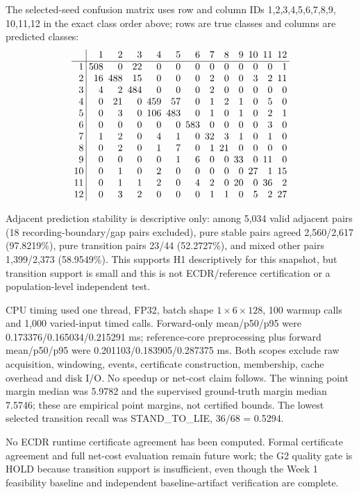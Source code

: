 \documentclass[11pt,a4paper]{article}
\begin{document}
The selected-seed confusion matrix uses row and column IDs 1,2,3,4,5,6,7,8,9,
10,11,12 in the exact class order above; rows are true classes and columns are
predicted classes:
\[
\setlength{\arraycolsep}{2.5pt}
\begin{array}{r|rrrrrrrrrrrr}
&1&2&3&4&5&6&7&8&9&10&11&12\\\hline
1&508&0&22&0&0&0&0&0&0&0&0&1\\
2&16&488&15&0&0&0&2&0&0&3&2&11\\
3&4&2&484&0&0&0&2&0&0&0&0&0\\
4&0&21&0&459&57&0&1&2&1&0&5&0\\
5&0&3&0&106&483&0&1&0&1&0&2&1\\
6&0&0&0&0&0&583&0&0&0&0&3&0\\
7&1&2&0&4&1&0&32&3&1&0&1&0\\
8&0&2&0&1&7&0&1&21&0&0&0&0\\
9&0&0&0&0&1&6&0&0&33&0&11&0\\
10&0&1&0&2&0&0&0&0&0&27&1&15\\
11&0&1&1&2&0&4&2&0&20&0&36&2\\
12&0&3&2&0&0&0&1&1&0&5&2&27
\end{array}
\]

Adjacent prediction stability is descriptive only: among 5,034 valid adjacent
pairs (18 recording-boundary/gap pairs excluded), pure stable pairs agreed
2,560/2,617 (97.8219\%), pure transition pairs 23/44 (52.2727\%), and mixed
other pairs 1,399/2,373 (58.9549\%). This supports H1 descriptively for this
snapshot, but transition support is small and this is not ECDR/reference
certification or a population-level independent test.

CPU timing used one thread, FP32, batch shape $1\times6\times128$, 100 warmup
calls and 1,000 varied-input timed calls. Forward-only mean/p50/p95 were
0.173376/0.165034/0.215291 ms; reference-core preprocessing plus forward
mean/p50/p95 were 0.201103/0.183905/0.287375 ms. Both scopes exclude raw
acquisition, windowing, events, certificate construction, membership, cache
overhead and disk I/O. No speedup or net-cost claim follows. The winning point
margin median was 5.9782 and the supervised ground-truth margin median 7.5746;
these are empirical point margins, not certified bounds. The lowest selected
transition recall was STAND\_TO\_LIE, 36/68 = 0.5294.

No ECDR runtime certificate agreement has been computed. Formal certificate
agreement and full net-cost evaluation remain future work; the G2 quality gate
is HOLD because transition support is insufficient, even though the Week 1
feasibility baseline and independent baseline-artifact verification are complete.
\end{document}
